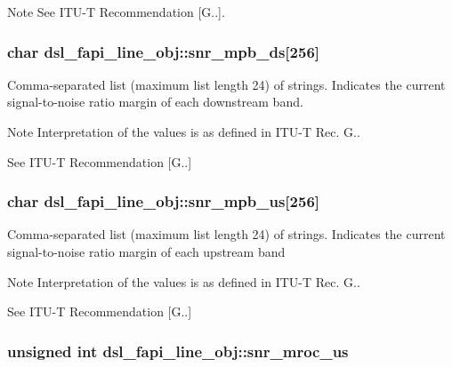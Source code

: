 \begin{DoxyNote}{Note}
See I\-T\-U-\/\-T Recommendation \mbox{[}G..\mbox{]}. 
\end{DoxyNote}
\hypertarget{structdsl__fapi__line__obj_a7e443ec40d324e5b435873f8e8823d69}{
\subsubsection[{snr\-\_\-mpb\-\_\-ds}]{\setlength{\rightskip}{0pt plus 5cm}char dsl\-\_\-fapi\-\_\-line\-\_\-obj\-::snr\-\_\-mpb\-\_\-ds\mbox{[}256\mbox{]}}}\label{structdsl__fapi__line__obj_a7e443ec40d324e5b435873f8e8823d69}
Comma-\/separated list (maximum list length 24) of strings. Indicates the current signal-\/to-\/noise ratio margin of each downstream band. \begin{DoxyNote}{Note}
Interpretation of the values is as defined in I\-T\-U-\/\-T Rec. G.. 

See I\-T\-U-\/\-T Recommendation \mbox{[}G..\mbox{]} 
\end{DoxyNote}
\hypertarget{structdsl__fapi__line__obj_a8298962b9eab965d69375c8dc8689c38}{
\subsubsection[{snr\-\_\-mpb\-\_\-us}]{\setlength{\rightskip}{0pt plus 5cm}char dsl\-\_\-fapi\-\_\-line\-\_\-obj\-::snr\-\_\-mpb\-\_\-us\mbox{[}256\mbox{]}}}\label{structdsl__fapi__line__obj_a8298962b9eab965d69375c8dc8689c38}
Comma-\/separated list (maximum list length 24) of strings. Indicates the current signal-\/to-\/noise ratio margin of each upstream band \begin{DoxyNote}{Note}
Interpretation of the values is as defined in I\-T\-U-\/\-T Rec. G.. 

See I\-T\-U-\/\-T Recommendation \mbox{[}G..\mbox{]} 
\end{DoxyNote}
\hypertarget{structdsl__fapi__line__obj_a5f17749bee44180af66d7b9d25795d34}{
\subsubsection[{snr\-\_\-mroc\-\_\-us}]{\setlength{\rightskip}{0pt plus 5cm}unsigned int dsl\-\_\-fapi\-\_\-line\-\_\-obj\-::snr\-\_\-mroc\-\_\-us}}\label{structdsl__fapi__line__obj_a5f17749bee44180af66d7b9d25795d34}
